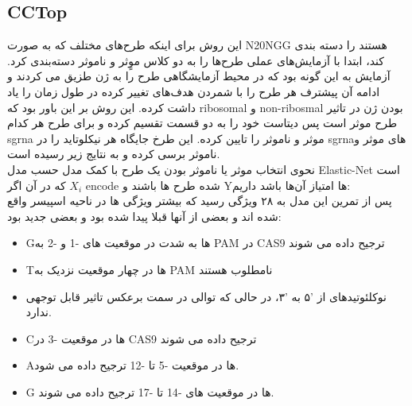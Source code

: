 \documentclass[12pt,a4paper,BCOR=.7cm,headsepline,bibliography=totoc]{report}
\begin{document}
\subsection{CCTop~\cite{CCTop}}
این روش برای اینکه طرح‌های مختلف که به صورت N20NGG هستند را دسته بندی کند، ابتدا با آزمایش‌های عملی طرح‌ها را به دو کلاس موٍثر و ناموثر دسته‌بندی کرد. آزمایش به این گونه بود که در محیط آزمایشگاهی طرح را به ژن طزیق می کردند و ادامه آن پیشترف هر طرح را با شمردن هدف‌های تغییر کرده در طول زمان را یاد داشت کرده. این روش بر این باور بود که ribosomal و non-ribosmal بودن ژن در تاثیر طرح موثر است پس دیتاست خود را به دو قسمت تقسیم کرده و برای طرح هر کدام sgrna موثر و ناموثر را تایین کرده. این طرخ جایگاه هر نیکلوتاید را در sgrnaهای موثر و ناموثر برسی کرده و به نتایج زیر رسیده است.\\
نحوی انتخاب موثر یا ناموثر بودن یک طرح با کمک مدل حسب مدل  Elastic-Net است که در آن اگر
 $X_i$
encode شده طرح ها باشند
و Yها امتیاز آن‌ها باشد داریم:
\\
پس از تمرین این مدل به ۲۸ ویژگی رسید که بیشتر ویژگی ها در ناحیه اسپیسر واقع شده اند و بعضی از آنها قبلا پیدا شده بود و بعضی جدید بود:
\begin{itemize}
\item Gها به شدت در موقعیت های -1 و -2 به PAM در CAS9 ترجیح داده می شوند
\item Tها در چهار موقعیت نزدیک به PAM نامطلوب هستند
\item
  نوکلئوتیدهای از '۵ به '۳، در حالی که توالی در سمت برعکس تاثیر قابل توجهی ندارد.
\item Cها در موقعیت -3 در CAS9 ترجیح داده می شوند
\item Aها در موقعیت -5 تا -12 ترجیح داده می شود.
\item G ها در موقعیت های -14 تا -17 ترجیح داده می شوند.
\end{itemize}
\end{document}

